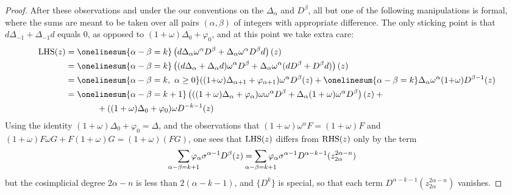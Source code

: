 \documentclass[11pt]{amsart}
\theoremstyle{plain}
\theoremstyle{definition}
\let\phi\varphi
\theoremstyle{plain}
\newcommand{\twist}{\omega}
\begin{document}
\begin{External spectral sequence operations}
\begin{proof}
After these observations and under the our conventions on the $\Delta_\alpha$ and $D^\beta$, all but one of the following manipulations is formal, where the sums are meant to be taken over all pairs $(\alpha,\beta)$ of integers with appropriate difference. The only sticking point is that $d\Delta_{-1}+\Delta_{-1}d$ equals $0$, as opposed to $(1{+}\twist)\Delta_0+\phi_0$, and at this point we take extra care:
%
\begin{alignat*}{2}
\textup{LHS}(z)
&=
\onelinesum{\alpha-\beta=k}\left(d\Delta_\alpha\twist^\alpha D^\beta+\Delta_\alpha\twist^\alpha D^\beta d\right)(z)%
\\
&=
\onelinesum{\alpha-\beta=k}\left((d\Delta_\alpha+
\Delta_\alpha d)\twist^\alpha D^\beta+
\Delta_\alpha\twist^\alpha (dD^\beta+
D^\beta d)\right)(z)%
\\
&=
\onelinesum{\alpha-\beta=k,\ \alpha\geq0}((1{+}\twist)\Delta_{\alpha+1}+\phi_{\alpha+1})\twist^\alpha D^\beta(z)+ \onelinesum{\alpha-\beta=k} \Delta_\alpha\twist^\alpha(1{+}\twist) D^{\beta-1}(z)%
\\
&=
\onelinesum{\alpha-\beta=k+1} \left(((1+\twist)\Delta_{\alpha}+ \phi_{\alpha})\twist\twist^{\alpha} D^\beta+\Delta_\alpha(1+\twist)\twist^\alpha D^{\beta}\right)(z) + {}%
\\
&\ \ \ \ \ \ \ \ \ \ \ +
((1+\twist)\Delta_{0}+\phi_{0})\twist D^{-k-1}(z)
\end{alignat*}
Using the identity $(1+\twist)\Delta_{0}+\phi_{0}=\Delta$, and the observations that $(1+\twist)\twist^\alpha F=(1+\twist)F$ and $(1+\twist)F\twist G+F(1+\twist)G=(1+\twist)(FG)$, one sees that $\textup{LHS}(z)$ differs from $\textup{RHS}(z)$ only by the term
\[\sum_{\mathclap{\alpha-\beta=k+1}} \phi_{\alpha}\sigma^{\alpha-1}D^{\beta}(z)=\sum_{\mathclap{\alpha-\beta=k+1}} \phi_{\alpha}\sigma^{\alpha-1}D^{\alpha-k-1}(z_{2\alpha}^{2\alpha-n})\]
but the cosimplicial degree $2\alpha-n$ is less than $2(\alpha-k-1)$, and $\{D^k\}$ is special, so that each term $D^{\alpha-k-1}(z_{2\alpha}^{2\alpha-n})$ vanishes.
\end{proof}

















\end{External spectral sequence operations}
\end{document}
